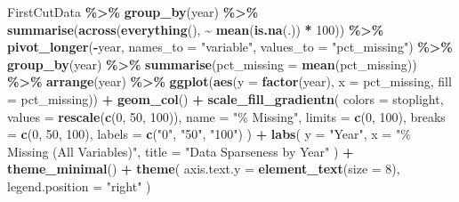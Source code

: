 \documentclass[
]{article}
\newenvironment{Shaded}{\begin{snugshade}}{\end{snugshade}}
\newcommand{\AttributeTok}[1]{\textcolor[rgb]{0.13,0.29,0.53}{#1}}
\newcommand{\DecValTok}[1]{\textcolor[rgb]{0.00,0.00,0.81}{#1}}
\newcommand{\FunctionTok}[1]{\textcolor[rgb]{0.13,0.29,0.53}{\textbf{#1}}}
\newcommand{\NormalTok}[1]{#1}
\newcommand{\SpecialCharTok}[1]{\textcolor[rgb]{0.81,0.36,0.00}{\textbf{#1}}}
\newcommand{\StringTok}[1]{\textcolor[rgb]{0.31,0.60,0.02}{#1}}
\begin{document}
\begin{Shaded}
\begin{Highlighting}[]
\NormalTok{FirstCutData }\SpecialCharTok{\%\textgreater{}\%}
  \FunctionTok{group\_by}\NormalTok{(year) }\SpecialCharTok{\%\textgreater{}\%}
  \FunctionTok{summarise}\NormalTok{(}\FunctionTok{across}\NormalTok{(}\FunctionTok{everything}\NormalTok{(), }\SpecialCharTok{\textasciitilde{}} \FunctionTok{mean}\NormalTok{(}\FunctionTok{is.na}\NormalTok{(.)) }\SpecialCharTok{*} \DecValTok{100}\NormalTok{)) }\SpecialCharTok{\%\textgreater{}\%}
  \FunctionTok{pivot\_longer}\NormalTok{(}\SpecialCharTok{{-}}\NormalTok{year, }\AttributeTok{names\_to =} \StringTok{"variable"}\NormalTok{, }\AttributeTok{values\_to =} \StringTok{"pct\_missing"}\NormalTok{) }\SpecialCharTok{\%\textgreater{}\%}
  \FunctionTok{group\_by}\NormalTok{(year) }\SpecialCharTok{\%\textgreater{}\%}
  \FunctionTok{summarise}\NormalTok{(}\AttributeTok{pct\_missing =} \FunctionTok{mean}\NormalTok{(pct\_missing)) }\SpecialCharTok{\%\textgreater{}\%}
  \FunctionTok{arrange}\NormalTok{(year) }\SpecialCharTok{\%\textgreater{}\%}
  \FunctionTok{ggplot}\NormalTok{(}\FunctionTok{aes}\NormalTok{(}\AttributeTok{y =} \FunctionTok{factor}\NormalTok{(year), }\AttributeTok{x =}\NormalTok{ pct\_missing, }\AttributeTok{fill =}\NormalTok{ pct\_missing)) }\SpecialCharTok{+}
  \FunctionTok{geom\_col}\NormalTok{() }\SpecialCharTok{+}
  \FunctionTok{scale\_fill\_gradientn}\NormalTok{(}
    \AttributeTok{colors =}\NormalTok{ stoplight,}
    \AttributeTok{values =} \FunctionTok{rescale}\NormalTok{(}\FunctionTok{c}\NormalTok{(}\DecValTok{0}\NormalTok{, }\DecValTok{50}\NormalTok{, }\DecValTok{100}\NormalTok{)),}
    \AttributeTok{name =} \StringTok{"\% Missing"}\NormalTok{,}
    \AttributeTok{limits =} \FunctionTok{c}\NormalTok{(}\DecValTok{0}\NormalTok{, }\DecValTok{100}\NormalTok{),}
    \AttributeTok{breaks =} \FunctionTok{c}\NormalTok{(}\DecValTok{0}\NormalTok{, }\DecValTok{50}\NormalTok{, }\DecValTok{100}\NormalTok{),}
    \AttributeTok{labels =} \FunctionTok{c}\NormalTok{(}\StringTok{"0"}\NormalTok{, }\StringTok{"50"}\NormalTok{, }\StringTok{"100"}\NormalTok{)}
\NormalTok{  ) }\SpecialCharTok{+}
  \FunctionTok{labs}\NormalTok{(}
    \AttributeTok{y =} \StringTok{"Year"}\NormalTok{,}
    \AttributeTok{x =} \StringTok{"\% Missing (All Variables)"}\NormalTok{,}
    \AttributeTok{title =} \StringTok{"Data Sparseness by Year"}
\NormalTok{  ) }\SpecialCharTok{+}
  \FunctionTok{theme\_minimal}\NormalTok{() }\SpecialCharTok{+}
  \FunctionTok{theme}\NormalTok{(}
    \AttributeTok{axis.text.y =} \FunctionTok{element\_text}\NormalTok{(}\AttributeTok{size =} \DecValTok{8}\NormalTok{),}
    \AttributeTok{legend.position =} \StringTok{"right"}
\NormalTok{  )}
\end{Highlighting}
\end{Shaded}
\end{document}
